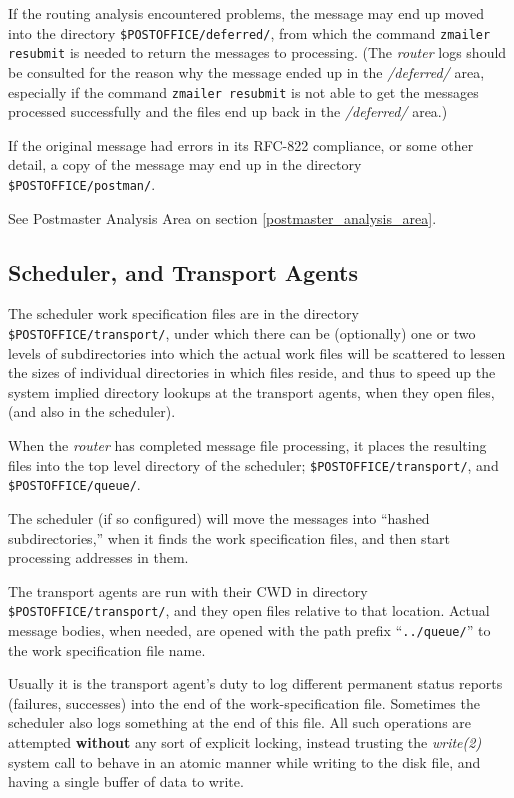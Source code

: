 If the routing analysis encountered problems, the message
may end up moved into the directory {\tt \$POSTOFFICE/deferred/}, from
which the command {\tt zmailer resubmit} is needed to return 
the messages to processing. (The {\em router} logs should be consulted 
for the reason why the message ended up in the {\em /deferred/} area,
especially if the command {\tt zmailer resubmit} is not able
to get the messages processed successfully and
the files end up back in the {\em /deferred/} area.)

If the original message had errors in its RFC-822 compliance,
or some other detail, a copy of the message may end up in the 
directory {\tt \$POSTOFFICE/postman/}.  

See Postmaster Analysis Area on section \vref{postmaster_analysis_area}.

\subsection{Scheduler, and Transport Agents}


The scheduler work specification files are in the directory
{\tt \$POSTOFFICE/transport/}, under which there can be (optionally)
one or two levels of subdirectories into which the actual
work files will be scattered to lessen the sizes of individual
directories in which files reside, and thus to speed up the
system implied directory lookups at the transport agents, when
they open files, (and also in the scheduler).

When the {\em router} has completed message file processing, it places the
resulting files into the top level directory of the scheduler; 
{\tt \$POSTOFFICE/transport/}, and {\tt \$POSTOFFICE/queue/}.

The scheduler (if so configured) will move the messages into 
``hashed subdirectories,'' when it finds the work specification files, 
and then start processing addresses in them.

The transport agents are run with their CWD in directory 
{\tt \$POSTOFFICE/transport/}, 
and they open files relative to that location. Actual message bodies, when 
needed, are opened with the path prefix ``{\tt ../queue/}'' to the work 
specification file name.

Usually it is the transport agent's duty to log different permanent status reports 
(failures, successes) into the end of the work-specification file.  
Sometimes the scheduler also logs something at the end of this file.  
All such operations are attempted {\bf without} any sort 
of explicit locking, instead trusting the {\em write(2)} system call to 
behave in an atomic manner while writing to the disk file, and 
having a single buffer of data to write.

